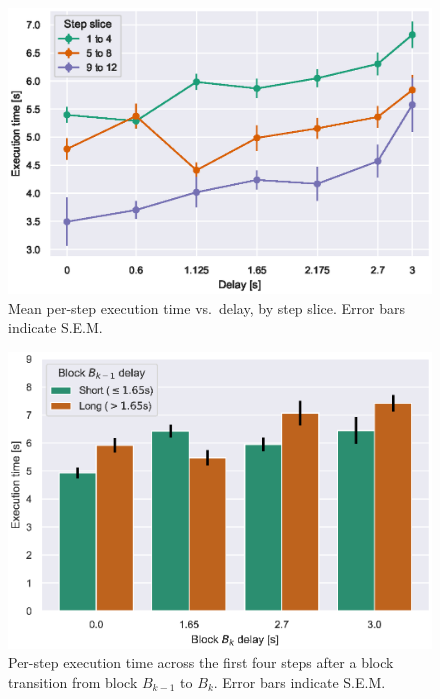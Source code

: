 \begin{figure}[h]
    \centering
    \includegraphics[width=.8\textwidth]{publications/2021ImpactDelayedResponse/Fig7.eps}
    \caption{Mean per-step execution time vs.\ delay, by step slice.
    Error bars indicate S.E.M.}
    \label{fig:exectime:delay:slice}
\end{figure}

\begin{figure}[h]
    \centering
    \includegraphics[width=.8\textwidth]{publications/2021ImpactDelayedResponse/Fig8.eps}
    \caption{Per-step execution time across the first four steps after a block transition from block \( B_{k-1} \) to
        \( B_k \). Error bars indicate S.E.M.}\label{fig:exectime:transition}%
\end{figure}

